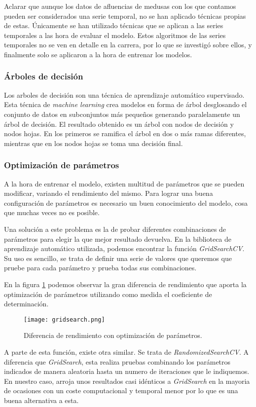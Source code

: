 Aclarar que aunque los datos de afluencias de medusas con los que contamos pueden ser considerados una serie temporal, no se han aplicado técnicas propias de estas. Únicamente se han utilizado técnicas que se aplican a las series temporales a las hora de evaluar el modelo. Estos algoritmos de las series temporales no se ven en detalle en la carrera, por lo que se investigó sobre ellos, y finalmente solo se aplicaron a la hora de entrenar los modelos.

\subsubsection{Árboles de decisión}

Los arboles de decisión son una técnica de aprendizaje automático supervisado. Esta técnica de \emph{machine learning} crea modelos en forma de árbol  desglosando el conjunto de datos en subconjuntos más pequeños generando paralelamente un árbol de decisión. El resultado obtenido es un árbol con nodos de decisión y nodos hojas. En los primeros se ramifica el árbol en dos o más ramas diferentes, mientras que en los nodos hojas se toma una decisión final.

\subsubsection{Optimización de parámetros}

A la hora de entrenar el modelo, existen multitud de parámetros que se pueden modificar, variando el rendimiento del mismo. Para lograr una buena configuración de parámetros es necesario un buen conocimiento del modelo, cosa que muchas veces no es posible.

Una solución a este problema es la de probar diferentes combinaciones de parámetros para elegir la que mejor resultado devuelva. En la biblioteca de aprendizaje automático utilizada, podemos encontrar la función \emph{GridSearchCV}. Su uso es sencillo, se trata de definir una serie de valores que queremos que pruebe para cada parámetro y prueba todas sus combinaciones.

En la figura \ref{parametros} podemos observar la gran diferencia de rendimiento que aporta la optimización de parámetros utilizando como medida el coeficiente de determinación.

\begin{figure}%
	\centering
	\texttt{[image: gridsearch.png]}
	\caption[Diferencia de rendimiento con optimización de parámetros]{Diferencia de rendimiento con optimización de parámetros.}\label{parametros}
\end{figure}

A parte de esta función, existe otra similar. Se trata de \emph{RandomizedSearchCV}. A diferencia que \emph{GridSearch}, esta realiza pruebas combinando los parámetros indicados de manera aleatoria hasta un numero de iteraciones que le indiquemos. En nuestro caso, arroja unos resultados casi idénticos a \emph{GridSearch} en la mayoria de ocasiones con un coste computacional y temporal menor por lo que es una buena alternativa a esta.